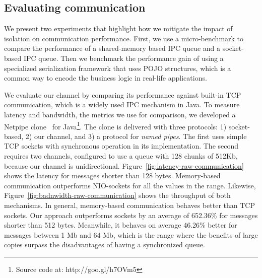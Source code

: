 \subsection{Evaluating communication}
We present two experiments that highlight how we mitigate the impact of isolation on communication performance. %
First, we use a micro-benchmark to compare the performance of a shared-memory based IPC queue and a socket-based IPC queue. %
Then we benchmark the performance gain of using a specialized serialization framework that uses POJO structures, which is a common way to encode the business logic in real-life applications.
   
We evaluate our channel by comparing its performance against built-in TCP communication, which is a widely used IPC mechanism in Java.
To measure latency and bandwidth, the metrics we use for comparison, we developed a Netpipe clone~\cite{Snell96netpipe:a} for Java\footnote{Source code at: http://goo.gl/h7OVm5}.
The clone is delivered with three protocols: 1) socket-based, 2) our channel, and 3) a protocol for \textit{named pipes}.
The first uses simple TCP sockets with synchronous operation in its implementation. 
The second requires two channels, configured to use a queue with 128 chunks of 512Kb, because our channel is unidirectional.
Figure~\ref{fig:latency-raw-communication} shows the latency for messages shorter than 128 bytes.
Memory-based communication outperforms NIO-sockets for all the values in the range.
Likewise, Figure~\ref{fig:badnwidth-raw-communication} shows the throughput of both mechanisms.
In general, memory-based communication behaves better than TCP sockets.
Our approach outperforms sockets by an average of 652.36\% for messages shorter than 512 bytes.
Meanwhile, it behaves on average 46.26\% better for messages between 1 Mb and 64 Mb, which is the range where the benefits of large copies surpass the disadvantages of having a synchronized queue.

